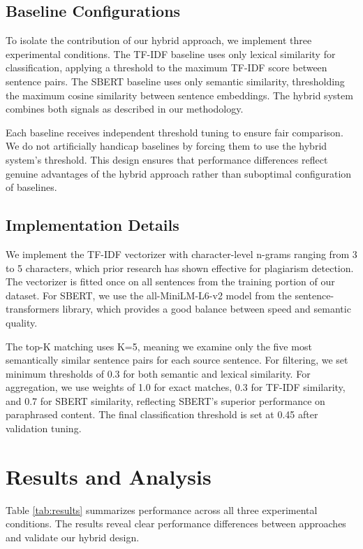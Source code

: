 \documentclass[conference]{IEEEtran}
\begin{document}
\subsection{Baseline Configurations}

To isolate the contribution of our hybrid approach, we implement three experimental conditions. The TF-IDF baseline uses only lexical similarity for classification, applying a threshold to the maximum TF-IDF score between sentence pairs. The SBERT baseline uses only semantic similarity, thresholding the maximum cosine similarity between sentence embeddings. The hybrid system combines both signals as described in our methodology.

Each baseline receives independent threshold tuning to ensure fair comparison. We do not artificially handicap baselines by forcing them to use the hybrid system's threshold. This design ensures that performance differences reflect genuine advantages of the hybrid approach rather than suboptimal configuration of baselines.

\subsection{Implementation Details}

We implement the TF-IDF vectorizer with character-level n-grams ranging from 3 to 5 characters, which prior research has shown effective for plagiarism detection. The vectorizer is fitted once on all sentences from the training portion of our dataset. For SBERT, we use the all-MiniLM-L6-v2 model from the sentence-transformers library, which provides a good balance between speed and semantic quality.

The top-K matching uses K=5, meaning we examine only the five most semantically similar sentence pairs for each source sentence. For filtering, we set minimum thresholds of 0.3 for both semantic and lexical similarity. For aggregation, we use weights of 1.0 for exact matches, 0.3 for TF-IDF similarity, and 0.7 for SBERT similarity, reflecting SBERT's superior performance on paraphrased content. The final classification threshold is set at 0.45 after validation tuning.

\section{Results and Analysis}

Table \ref{tab:results} summarizes performance across all three experimental conditions. The results reveal clear performance differences between approaches and validate our hybrid design.
\end{document}
